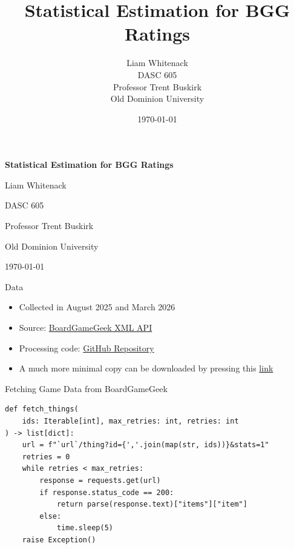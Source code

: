 \documentclass{beamer}
\title{Statistical Estimation for BGG Ratings}
\author{Liam Whitenack \\
DASC 605 \\
Professor Trent Buskirk \\
Old Dominion University}
\date{\today}
\begin{document}

\begin{frame}[plain]
\centering

\vspace{1.5cm}

{\Huge\bfseries\textcolor{ODUNavy}{Statistical Estimation for BGG Ratings}}

\vspace{1cm}

{\large Liam Whitenack}

DASC 605

Professor Trent Buskirk

Old Dominion University

\vspace{1cm}

{\small \today}

\end{frame}


\begin{frame}{Data}
\small
\begin{itemize}
\item Collected in August 2025 and March 2026
\item Source: \href{https://boardgamegeek.com/wiki/page/BGG_XML_API2}{BoardGameGeek XML API}
\item Processing code: \href{https://github.com/LiamWhitenack/board-game-geek.git}{GitHub Repository}
\item A much more minimal copy can be downloaded by pressing this \href{https://boardgamegeek.com/data_dumps/bg_ranks}{link}
\end{itemize}
\end{frame}

\begin{frame}[fragile]{Fetching Game Data from BoardGameGeek}

\begin{verbatim}
def fetch_things(
    ids: Iterable[int], max_retries: int, retries: int
) -> list[dict]:
    url = f"`url`/thing?id={','.join(map(str, ids))}&stats=1"
    retries = 0
    while retries < max_retries:
        response = requests.get(url)
        if response.status_code == 200:
            return parse(response.text)["items"]["item"]
        else:
            time.sleep(5)
    raise Exception()
\end{verbatim}

\end{frame}
\end{document}
